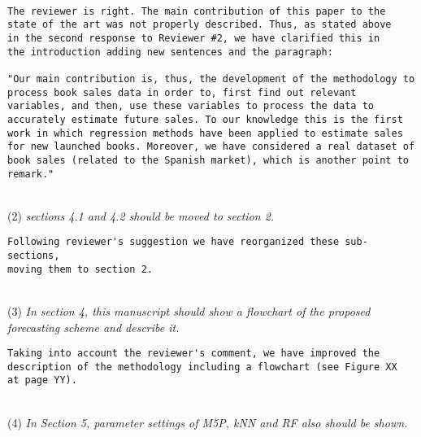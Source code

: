 \documentclass[preprint]{elsarticle}
\begin{document}
\begin{verbatim}

The reviewer is right. The main contribution of this paper to the 
state of the art was not properly described. Thus, as stated above 
in the second response to Reviewer #2, we have clarified this in 
the introduction adding new sentences and the paragraph:

"Our main contribution is, thus, the development of the methodology to process book sales data in order to, first find out relevant variables, and then, use these variables to process the data to accurately estimate future sales. To our knowledge this is the first work in which regression methods have been applied to estimate sales for new launched books. Moreover, we have considered a real dataset of book sales (related to the Spanish market), which is another point to remark."

\end{verbatim}

~\\
\noindent (2) \emph{sections 4.1 and 4.2 should be moved to section 2. } 

\begin{verbatim}
Following reviewer's suggestion we have reorganized these sub-sections, 
moving them to section 2.
\end{verbatim}


~\\
\noindent (3) \emph{In section 4, this manuscript should show a flowchart of the proposed forecasting scheme and describe it. } 

\begin{verbatim}
Taking into account the reviewer's comment, we have improved the 
description of the methodology including a flowchart (see Figure XX 
at page YY).
\end{verbatim}


~\\
\noindent (4) \emph{In Section 5, parameter settings of 
M5P, kNN and RF also should be shown. } 
\end{document}
